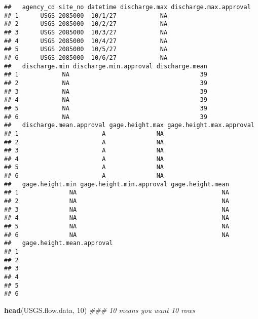 \documentclass[]{article}
\newenvironment{Shaded}{\begin{snugshade}}{\end{snugshade}}
\newcommand{\CommentTok}[1]{\textcolor[rgb]{0.56,0.35,0.01}{\textit{#1}}}
\newcommand{\DecValTok}[1]{\textcolor[rgb]{0.00,0.00,0.81}{#1}}
\newcommand{\KeywordTok}[1]{\textcolor[rgb]{0.13,0.29,0.53}{\textbf{#1}}}
\newcommand{\NormalTok}[1]{#1}
\begin{document}
\begin{verbatim}
##   agency_cd site_no datetime discharge.max discharge.max.approval
## 1      USGS 2085000  10/1/27            NA                       
## 2      USGS 2085000  10/2/27            NA                       
## 3      USGS 2085000  10/3/27            NA                       
## 4      USGS 2085000  10/4/27            NA                       
## 5      USGS 2085000  10/5/27            NA                       
## 6      USGS 2085000  10/6/27            NA                       
##   discharge.min discharge.min.approval discharge.mean
## 1            NA                                    39
## 2            NA                                    39
## 3            NA                                    39
## 4            NA                                    39
## 5            NA                                    39
## 6            NA                                    39
##   discharge.mean.approval gage.height.max gage.height.max.approval
## 1                       A              NA                         
## 2                       A              NA                         
## 3                       A              NA                         
## 4                       A              NA                         
## 5                       A              NA                         
## 6                       A              NA                         
##   gage.height.min gage.height.min.approval gage.height.mean
## 1              NA                                        NA
## 2              NA                                        NA
## 3              NA                                        NA
## 4              NA                                        NA
## 5              NA                                        NA
## 6              NA                                        NA
##   gage.height.mean.approval
## 1                          
## 2                          
## 3                          
## 4                          
## 5                          
## 6
\end{verbatim}

\begin{Shaded}
\begin{Highlighting}[]
\KeywordTok{head}\NormalTok{(USGS.flow.data, }\DecValTok{10}\NormalTok{) }\CommentTok{### 10 means you want 10 rows}
\end{Highlighting}
\end{Shaded}
\end{document}

